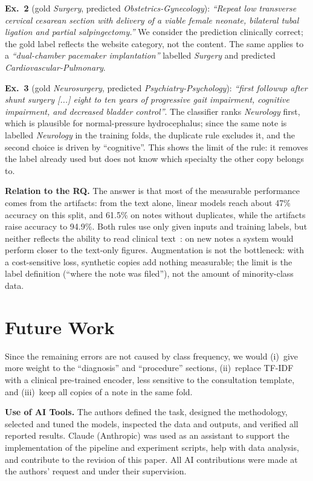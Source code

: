 \documentclass[twocolumn,10pt]{article}
\newcommand{\tfidf}{TF-IDF\xspace}
\newcommand{\spec}[1]{\textit{#1}}
\begin{document}
\textbf{Ex.~2} (gold \spec{Surgery}, predicted \spec{Obstetrics-Gynecology}): \emph{``Repeat low transverse cervical cesarean section with delivery of a viable female neonate, bilateral tubal ligation and partial salpingectomy.''} We consider the prediction clinically correct; the gold label reflects the website category, not the content. The same applies to a \emph{``dual-chamber pacemaker implantation''} labelled \spec{Surgery} and predicted \spec{Cardiovascular-Pulmonary}.

\textbf{Ex.~3} (gold \spec{Neurosurgery}, predicted \spec{Psychiatry-Psychology}): \emph{``first followup after shunt surgery [...] eight to ten years of progressive gait impairment, cognitive impairment, and decreased bladder control''}. The classifier ranks \spec{Neurology} first, which is plausible for normal-pressure hydrocephalus; since the same note is labelled \spec{Neurology} in the training folds, the duplicate rule excludes it, and the second choice is driven by ``cognitive''. This shows the limit of the rule: it removes the label already used but does not know which specialty the other copy belongs to.

\textbf{Relation to the RQ.} The answer is that most of the measurable performance comes from the artifacts: from the text alone, linear models reach about 47\% accuracy on this split, and 61.5\% on notes without duplicates, while the artifacts raise accuracy to 94.9\%. Both rules use only given inputs and training labels, but neither reflects the ability to read clinical text~\cite{kaufman2012leakage}: on new notes a system would perform closer to the text-only figures. Augmentation is not the bottleneck: with a cost-sensitive loss, synthetic copies add nothing measurable; the limit is the label definition (``where the note was filed''), not the amount of minority-class data.

\section{Future Work}

Since the remaining errors are not caused by class frequency, we would (i)~give more weight to the ``diagnosis'' and ``procedure'' sections, (ii)~replace \tfidf with a clinical pre-trained encoder, less sensitive to the consultation template, and (iii)~keep all copies of a note in the same fold.

\renewcommand{\refname}{Bibliography}



\noindent\textbf{Use of AI Tools.} The authors defined the task, designed the methodology, selected and tuned the models, inspected the data and outputs, and verified all reported results. Claude (Anthropic) was used as an assistant to support the implementation of the pipeline and experiment scripts, help with data analysis, and contribute to the revision of this paper. All AI contributions were made at the authors' request and under their supervision.
\end{document}
